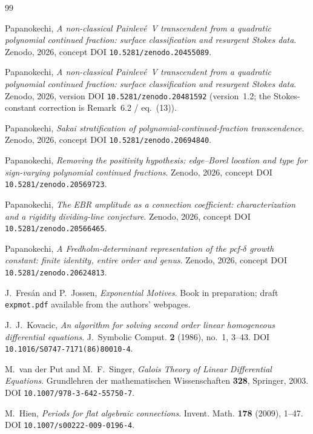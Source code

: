 \documentclass[11pt,reqno]{amsart}
\theoremstyle{plain}
\theoremstyle{definition}
\begin{document}
\begin{thebibliography}{99}

Papanokechi,
\emph{A non-classical Painlev\'e~V transcendent from a quadratic polynomial continued fraction:
surface classification and resurgent Stokes data}.
Zenodo, 2026, concept DOI \texttt{10.5281/zenodo.20455089}.

Papanokechi,
\emph{A non-classical Painlev\'e~V transcendent from a quadratic polynomial continued fraction:
surface classification and resurgent Stokes data}.
Zenodo, 2026, version DOI \texttt{10.5281/zenodo.20481592} (version~1.2; the Stokes-constant
correction is Remark~6.2 / eq.~(13)).

Papanokechi,
\emph{Sakai stratification of polynomial-continued-fraction transcendence}.
Zenodo, 2026, concept DOI \texttt{10.5281/zenodo.20694840}.

Papanokechi,
\emph{Removing the positivity hypothesis: edge--Borel location and type for sign-varying polynomial
continued fractions}.
Zenodo, 2026, concept DOI \texttt{10.5281/zenodo.20569723}.

Papanokechi,
\emph{The EBR amplitude as a connection coefficient: characterization and a rigidity dividing-line
conjecture}.
Zenodo, 2026, concept DOI \texttt{10.5281/zenodo.20566465}.

Papanokechi,
\emph{A Fredholm-determinant representation of the pcf-$\delta$ growth constant: finite identity,
entire order and genus}.
Zenodo, 2026, concept DOI \texttt{10.5281/zenodo.20624813}.

J.~Fres\'an and P.~Jossen,
\emph{Exponential Motives}.
Book in preparation; draft \texttt{expmot.pdf} available from the authors' webpages.

J.~J.~Kovacic,
\emph{An algorithm for solving second order linear homogeneous differential equations}.
J.~Symbolic Comput. \textbf{2} (1986), no.~1, 3--43.
DOI \texttt{10.1016/S0747-7171(86)80010-4}.

M.~van der Put and M.~F.~Singer,
\emph{Galois Theory of Linear Differential Equations}.
Grundlehren der mathematischen Wissenschaften \textbf{328}, Springer, 2003.
DOI \texttt{10.1007/978-3-642-55750-7}.

M.~Hien,
\emph{Periods for flat algebraic connections}.
Invent. Math. \textbf{178} (2009), 1--47.
DOI \texttt{10.1007/s00222-009-0196-4}.


\end{thebibliography}
\end{document}
